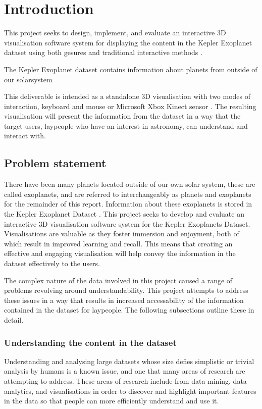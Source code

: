 \chapter{Introduction}\label{C:intro}
This project seeks to design, implement, and evaluate an interactive 3D
visualisation software system for displaying the content in the Kepler
Exoplanet dataset using both gesures and traditional interactive methods
\cite{dataset}.

The Kepler Exoplanet dataset contains information about planets from outside of our solarsystem


This deliverable is intended as a standalone
3D visualisation with two modes of interaction, keyboard and mouse or Microsoft
Xbox Kinect sensor \cite{kinect}. The resulting visualisation will present the
information from the dataset in a way that the target users, laypeople who have
an
interest in astronomy, can understand and interact with.
\section{Problem statement}
There have been many planets located outside of our own solar system,
these are called exoplanets, and are referred to interchangeably as planets and
exoplanets for the remainder of this report. Information about these exoplanets
is stored in the Kepler Exoplanet Dataset
\cite{dataset}. This project seeks to develop and evaluate an interactive 3D
visualisation software system for the Kepler Exoplanets Dataset. Visualisations
are valuable as they foster immersion and enjoyment, both of which result in
improved learning and recall. This means that
creating an effective and engaging visualisation will help convey the
information
in the dataset effectively to the users.

The complex nature of the data involved in this project caused a range of
problems revolving around understandability. This project
attempts to address these issues in a way that results in increased
accessability of the information contained in the dataset for laypeople. The
following subsections outline these in detail.

\subsection{Understanding the content in the dataset}
Understanding and analysing large datasets whose size defies simplistic or
trivial analysis by humans is a known issue, and one that many areas of research
are
attempting to address. These areas of research include from data mining, data
analytics, and visualisations in order to discover and highlight important
features in the data so that people can more efficiently understand and use it. 

